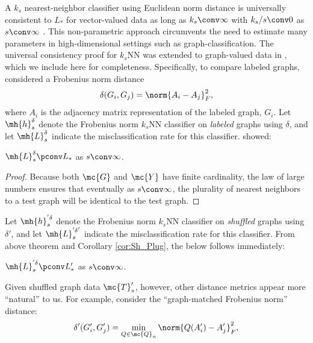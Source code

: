 \documentclass[10pt,journal,cspaper,compsoc]{IEEEtran}
\begin{document}
A $k_s$ nearest-neighbor classifier 
using Euclidean norm distance
is universally consistent to $L_*$ for vector-valued data 
as long as $k_s \conv \infty$ with $k_s/s \conv 0$ as $s \conv \infty$ \cite{Stone1977}. This non-parametric approach circumvents the need to estimate many parameters in high-dimensional settings such as graph-classification. The universal consistency proof for $k_s$NN was extended to graph-valued data in \cite{VP11_super}, which we include here for completeness.   Specifically, to compare labeled graphs, \cite{VP11_super} considered a Frobenius norm distance
\begin{align}
	\delta(G_i,G_j)=\norm{A_i-A_j}_F^2,
\end{align}
where $A_i$ is the adjacency matrix representation of the labeled graph, $G_i$.  
Let $\mh{h}_s^\delta$ denote the Frobenius norm $k_s$NN classifier on \emph{labeled} graphs using $\delta$, and let $\mh{L}^{\delta}_s$ indicate the misclassification rate for this classifier.  \cite{VP11_super} showed:
\begin{thm} \label{thm:5}
	$\mh{L}^{\delta}_s \pconv L_*$ as $s \conv \infty$.
\end{thm}
\begin{proof}
Because both $\mc{G}$ and $\mc{Y}$ have finite cardinality, the law of large numbers ensures that eventually as $s \conv \infty$, the plurality of nearest neighbors to a test graph will be identical to the test graph. 
\end{proof}
Let $\mh{h}_s^{'\delta}$ denote the Frobenius norm $k_s$NN classifier on \emph{shuffled} graphs using $\delta'$, and let $\mh{L}^{'\delta'}_s$ indicate the misclassification rate for this classifier.   %
From above theorem and Corollary \ref{cor:Sh_Plug},  the below follows immediately:
\begin{coro} \label{cor:knn1}
	$\mh{L}^{'\delta}_s \pconv L_*'$ as $s \conv \infty$.
\end{coro}
Given shuffled graph data $\mc{T}_s'$, however, other distance metrics appear more ``natural'' to us.  For example,  
consider the ``graph-matched Frobenius norm'' distance:
\begin{align} \label{eq:d}
\delta'(G_i',G_j')=\min_{Q \in \mc{Q}_n}\norm{Q(A_i')-A_j'}_F^2,	
\end{align}
\end{document}
